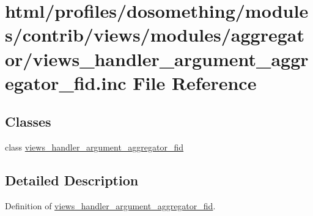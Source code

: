 \hypertarget{views__handler__argument__aggregator__fid_8inc}{
\section{html/profiles/dosomething/modules/contrib/views/modules/aggregator/views\_\-handler\_\-argument\_\-aggregator\_\-fid.inc File Reference}
\label{views__handler__argument__aggregator__fid_8inc}
}
\subsection*{Classes}
\begin{DoxyCompactItemize}
\item 
class \hyperlink{classviews__handler__argument__aggregator__fid}{views\_\-handler\_\-argument\_\-aggregator\_\-fid}
\end{DoxyCompactItemize}


\subsection{Detailed Description}
Definition of \hyperlink{classviews__handler__argument__aggregator__fid}{views\_\-handler\_\-argument\_\-aggregator\_\-fid}. 